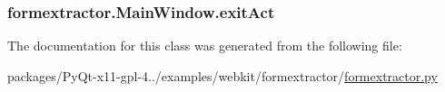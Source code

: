 \subsubsection[{exit\+Act}]{\setlength{\rightskip}{0pt plus 5cm}formextractor.\+Main\+Window.\+exit\+Act}\label{classformextractor_1_1MainWindow_aff381ba5a8383be5b16aee03ecae1dad}


The documentation for this class was generated from the following file\+:\begin{DoxyCompactItemize}
\item 
packages/\+Py\+Qt-\/x11-\/gpl-\/4../examples/webkit/formextractor/\hyperlink{formextractor_8py}{formextractor.\+py}\end{DoxyCompactItemize}
